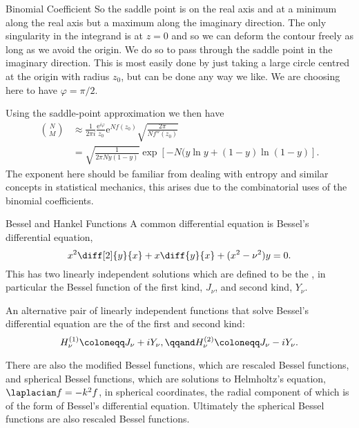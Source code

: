 \documentclass[fleqn]{NotesClass}
\newcommand*{\e}{\mathrm{e}}
\begin{document}
\begin{exm}{Binomial Coefficient}{}
        So the saddle point is on the real axis and at a minimum along the real axis but a maximum along the imaginary direction.
        The only singularity in the integrand is at \(z = 0\) and so we can deform the contour freely as long as we avoid the origin.
        We do so to pass through the saddle point in the imaginary direction.
        This is most easily done by just taking a large circle centred at the origin with radius \(z_0\), but can be done any way we like.
        We are choosing here to have \(\varphi = \pi/2\).
        
        Using the saddle-point approximation we then have
        \begin{align}
            \binom{N}{M} &\approx \frac{1}{2\pi i} \frac{\e^{i\varphi}}{z_0} \e^{Nf(z_0)} \sqrt{\frac{2\pi}{Nf''(z_0)}}\\
            &= \sqrt{\frac{1}{2\pi Ny(1 - y)}} \exp[-N(y\ln y + (1 - y)\ln(1 - y)].
        \end{align}
        The exponent here should be familiar from dealing with entropy and similar concepts in statistical mechanics, this arises due to the combinatorial uses of the binomial coefficients.
    \end{exm}
    
    \begin{dfn}{Bessel and Hankel Functions}{}
        A common differential equation is Bessel's differential equation,
        \begin{equation}
            x^2\diff[2]{y}{x} + x\diff{y}{x} + (x^2 - \nu^2)y = 0.
        \end{equation}
        This has two linearly independent solutions which are defined to be the , in particular the Bessel function of the first kind, \(J_\nu\), and second kind, \(Y_\nu\).
        
        An alternative pair of linearly independent functions that solve Bessel's differential equation are the  of the first and second kind:
        \begin{equation}
            H_\nu^{(1)} \coloneqq J_\nu + iY_\nu, \qqand H_{\nu}^{(2)} \coloneqq J_\nu - iY_\nu.
        \end{equation}
        
        There are also the modified Bessel functions, which are rescaled Bessel functions, and spherical Bessel functions, which are solutions to Helmholtz's equation, \(\laplacian f = -k^2f\), in spherical coordinates, the radial component of which is of the form of Bessel's differential equation.
        Ultimately the spherical Bessel functions are also rescaled Bessel functions.
    \end{dfn}
    
\end{document}
